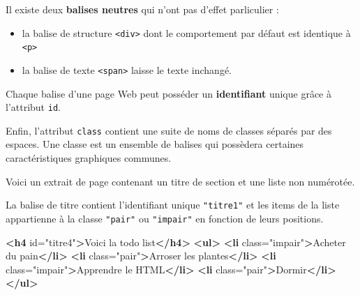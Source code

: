 \documentclass[a4paper,17pt]{extarticle}
\providecommand{\tightlist}{%
      \setlength{\itemsep}{0pt}\setlength{\parskip}{0pt}}
\newenvironment{Shaded}{}{}
\newcommand{\KeywordTok}[1]{\textcolor[rgb]{0.00,0.44,0.13}{\textbf{{#1}}}}
\newcommand{\StringTok}[1]{\textcolor[rgb]{0.25,0.44,0.63}{{#1}}}
\newcommand{\OtherTok}[1]{\textcolor[rgb]{0.00,0.44,0.13}{{#1}}}
\newcommand{\NormalTok}[1]{{#1}}
\begin{document}
Il existe deux \textbf{balises neutres} qui n'ont pas d'effet
parliculier :

\begin{itemize}
\tightlist
\item
  la balise de structure \texttt{\textless{}div\textgreater{}} dont le
  comportement par défaut est identique à
  \texttt{\textless{}p\textgreater{}}
\item
  la balise de texte \texttt{\textless{}span\textgreater{}} laisse le
  texte inchangé.
\end{itemize}

Chaque balise d'une page Web peut posséder un \textbf{identifiant}
unique grâce à l'attribut \texttt{id}.

Enfin, l'attribut \texttt{class} contient une suite de noms de classes
séparés par des espaces. Une classe est un ensemble de balises qui
possèdera certaines caractéristiques graphiques communes.
\begin{exemple}
    Voici un extrait de page contenant un titre de section et une liste non
numérotée.

La balise de titre contient l'identifiant unique \texttt{"titre1"} et
les items de la liste appartienne à la classe \texttt{"pair"} ou
\texttt{"impair"} en fonction de leurs positions.

\begin{Shaded}
\begin{Highlighting}[]
\KeywordTok{<h4}\OtherTok{ id=}\StringTok{"titre4"}\KeywordTok{>}\NormalTok{Voici la todo list}\KeywordTok{</h4>}
\KeywordTok{<ul>}
    \KeywordTok{<li}\OtherTok{ class=}\StringTok{"impair"}\KeywordTok{>}\NormalTok{Acheter du pain}\KeywordTok{</li>}
    \KeywordTok{<li}\OtherTok{ class=}\StringTok{"pair"}\KeywordTok{>}\NormalTok{Arroser les plantes}\KeywordTok{</li>}
    \KeywordTok{<li}\OtherTok{ class=}\StringTok{"impair"}\KeywordTok{>}\NormalTok{Apprendre le HTML}\KeywordTok{</li>}
    \KeywordTok{<li}\OtherTok{ class=}\StringTok{"pair"}\KeywordTok{>}\NormalTok{Dormir}\KeywordTok{</li>}
\KeywordTok{</ul>}
\end{Highlighting}
\end{Shaded}

            \end{exemple}

    
    
    
    
\end{document}
